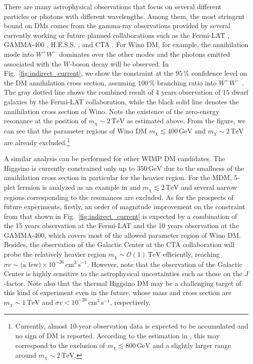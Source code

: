 \documentclass[12pt,twoside,book]{article}
\begin{document}
There are many astrophysical observations that focus on several different particles or photons with different wavelengths.
Among them, the most stringent bound on DMs comes from the gamma-ray observations provided by several currently working or future planned collaborations such as the Fermi-LAT \cite{Atwood_2009}, GAMMA-400 \cite{GALPER2013297}, H.E.S.S. \cite{Abdallah:2016ygi}, and CTA \cite{Carr:2015hta}.
For Wino DM, for example, the annihilation mode into $W^{+} W^{-}$ dominates over the other modes and the photons emitted associated with the $W$-boson decay will be observed.
In Fig.~\ref{fig:indirect_current}, we show the constraint at the $95\,\%$ confidence level on the DM annihilation cross section, assuming $100\,\%$ branching ratio into $W^{+} W^{-}$ \cite{Bhattacherjee:2014dya}.
The gray dotted line shows the combined result of $4$ years observation of $15$ dwarf galaxies by the Fermi-LAT collaboration, while the black solid line denotes the annihilation cross section of Wino.
Note the existence of the zero-energy resonance at the position of $m_\chi \sim 2\,\mathrm{TeV}$ as estimated above.
From the figure, we can see that the parameter regions of Wino DM $m_\chi \lesssim 400\,\mathrm{GeV}$ and $m_\chi \sim 2\,\mathrm{TeV}$ are already excluded.\footnote{
  Currently, almost $10$-year observation data is expected to be accumulated and no sign of DM is reported.
  According to the estimation in \cite{Bhattacherjee:2014dya}, this may correspond to the exclusion of $m_\chi \lesssim 800\,\mathrm{GeV}$ and a slightly larger range around $m_\chi \sim 2\,\mathrm{TeV}$.
}

A similar analysis can be performed for other WIMP DM candidates.
The Higgsino is currently constrained only up to $350\,\mathrm{GeV}$ \cite{Krall:2017xij} due to the smallness of the annihilation cross section in particular for the heavier region.
For the MDM, 5-plet fermion is analyzed as an example in \cite{Abdalla:2018mve} and $m_\chi \lesssim 2\,\mathrm{TeV}$ and several narrow regions corresponding to the resonances are excluded.
As for the prospects of future experiments, firstly, an order of magnitude improvement on the constraint from that shown in Fig.~\ref{fig:indirect_current} is expected \cite{Bhattacherjee:2014dya} by a combination of the 15 years observation at the Fermi-LAT and the 10 years observation at the GAMMA-400, which covers most of the allowed parameter region of Wino DM.
Besides, the observation of the Galactic Center at the CTA collaboration will probe the relatively heavier region $m_\chi \sim \mathcal{O}(1)\, \mathrm{TeV}$ efficiently, reaching $\sigma v \sim \text{(a few)} \times 10^{-26}\, \mathrm{cm^3\, s^{-1}}$.
However, note that the observation of the Galactic Center is highly sensitive to the astrophysical uncertainties such as those on the $J$-factor.
Note also that the thermal Higgsino DM may be a challenging target of this kind of experiment even in the future, whose mass and cross section are $m_\chi \sim 1\,\mathrm{TeV}$ and $\sigma v < 10^{-26}\, \mathrm{cm^3\, s^{-1}}$, respectively.
\end{document}
